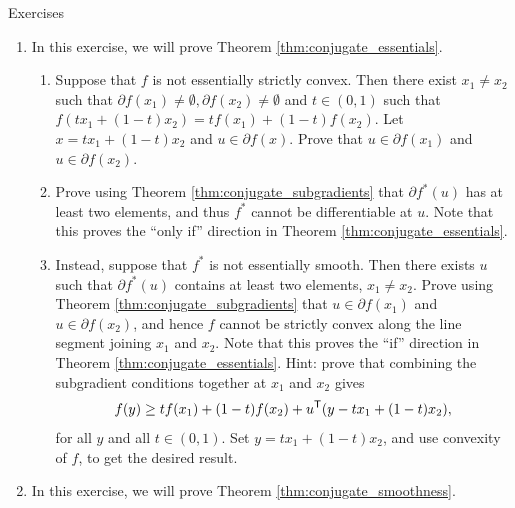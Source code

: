 \begin{xcb}{Exercises}
\begin{enumerate}[label=\thechapter.\arabic*]
\begin{enumerate}[label=\alph*.]
\item Prove that $0 \in \relint(\dom(f^*))$ if and only if the only directions
  of recession of $f$ (if any exist) are directions in which $f$ is
  constant. In this sense, statement (i) in Theorem
  \ref{thm:conjugate_minima} is similar to the second part of Theorem
  \ref{thm:weierstrass_convex}.     
\end{enumerate}

\item \label{ex:conjugate_essentials} 
  In this exercise, we will prove Theorem \ref{thm:conjugate_essentials}.

\begin{enumerate}[label=\alph*.]
\item Suppose that $f$ is not essentially strictly convex. Then there exist
  $x_1 \not= x_2$ such that $\partial f(x_1) \not= \emptyset, \partial f(x_2)
  \not= \emptyset$ and $t \in (0,1)$ such that $f(tx_1 + (1-t)x_2) = tf(x_1) +
  (1-t)f(x_2)$. Let $x = tx_1 + (1-t)x_2$ and $u \in \partial f(x)$. Prove that
  $u \in \partial f(x_1)$ and $u \in \partial f(x_2)$.  

\item Prove using Theorem \ref{thm:conjugate_subgradients} that $\partial
  f^*(u)$ has at least two elements, and thus $f^*$ cannot be differentiable at
  $u$. Note that this proves the ``only if'' direction in Theorem
  \ref{thm:conjugate_essentials}.  

\item Instead, suppose that $f^*$ is not essentially smooth. Then there exists 
  $u$ such that $\partial f^*(u)$ contains at least two elements, $x_1 \not= 
  x_2$. Prove using Theorem \ref{thm:conjugate_subgradients} that $u \in
  \partial f(x_1)$ and $u \in \partial f(x_2)$, and hence $f$ cannot be strictly
  convex along the line segment joining $x_1$ and $x_2$. Note that this proves
  the ``if'' direction in Theorem \ref{thm:conjugate_essentials}. Hint: prove
  that combining the subgradient conditions together at $x_1$ and $x_2$ gives  
  \[
  f(y) \geq tf(x_1) + (1-t)f(x_2) + u^{\mathsf{T}} (y - tx_1 + (1-t)x_2),
  \]
  for all $y$ and all $t \in (0,1)$. Set $y = tx_1 + (1-t)x_2$, and use
  convexity of $f$, to get the desired result. 
\end{enumerate}

\item \label{ex:conjugate_smoothness}
  In this exercise, we will prove Theorem \ref{thm:conjugate_smoothness}. 


\end{enumerate}
\end{xcb}
